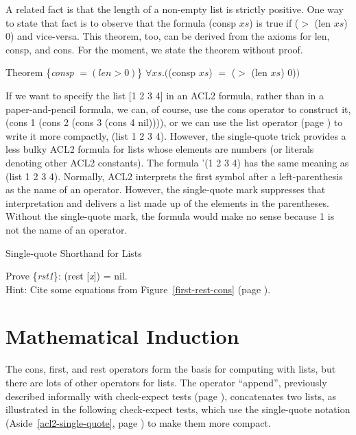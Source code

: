A related fact is that the length of a non-empty list is strictly positive.
One way to state that fact is to observe that the formula (consp $xs$) is true
if ($>$ (len $xs$) 0) and vice-versa. %
This theorem, too, can be derived from the axioms for
len, consp, and cons. For the moment,
we state the theorem without proof.
\begin{samepage}
\label{consp-len-thm}
\begin{center}
Theorem \{\emph{consp} $= (len > 0)$\} $\forall xs.($(consp $xs$) $=$ ($>$ (len $xs$) 0)$)$
\end{center}
\end{samepage}

\begin{aside}
If we want to specify the list [1 2 3 4] in an ACL2 formula,
rather than in a paper-and-pencil formula,
we can, of course, use the cons operator to construct it,
(cons 1 (cons 2 (cons 3 (cons 4 nil)))),
or we can use the list operator (page \pageref{list-op-informal}) to write it more compactly,
(list 1 2 3 4).
However, the single-quote trick provides a less bulky ACL2 formula for lists
whose elements are numbers (or literals denoting other ACL2 constants).
The formula
'(1 2 3 4) has the same meaning as (list 1 2 3 4).
Normally, ACL2 interprets the first symbol after a left-parenthesis
as the name of an operator.
However, the single-quote mark suppresses that interpretation and
delivers a list made up of the elements in the parentheses.
Without the single-quote mark,
the formula would make no sense because 1 is not the name of an operator.
\caption{Single-quote Shorthand for Lists}
\label{acl2-single-quote}
\end{aside}

\begin{ExerciseList}
\Exercise \label{rst1}
Prove \{\emph{rst1}\}: (rest [\emph{x}]) = nil.\\
Hint: Cite some equations from Figure~\ref{first-rest-cons} (page \pageref{first-rest-cons}).
\end{ExerciseList}

\section{Mathematical Induction}
\label{sec:induction}
The cons, first, and rest operators form the basis for computing with lists,
but there are lots of other operators for lists.
The operator ``append'', previously described informally with check-expect tests
(page \pageref{append-op-informal}), concatenates two lists, as illustrated
in the following check-expect tests,
which use the single-quote notation (Aside~\ref{acl2-single-quote}, page \pageref{acl2-single-quote})
to make them more compact.

